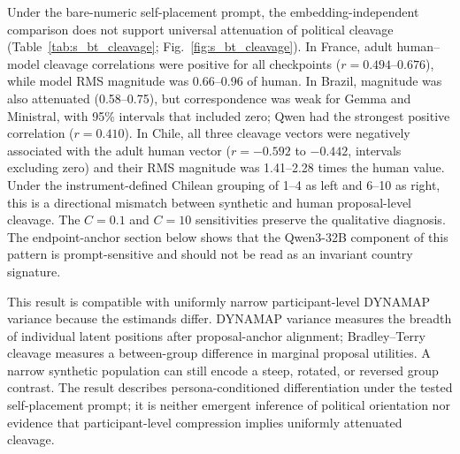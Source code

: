 \documentclass[unnumsec,webpdf,modern,large]{oup-authoring-template}
\begin{document}
Under the bare-numeric self-placement prompt, the embedding-independent comparison does not support universal attenuation of political cleavage (Table~\ref{tab:s_bt_cleavage}; Fig.~\ref{fig:s_bt_cleavage}). In France, adult human--model cleavage correlations were positive for all checkpoints ($r=0.494$--$0.676$), while model RMS magnitude was 0.66--0.96 of human. In Brazil, magnitude was also attenuated (0.58--0.75), but correspondence was weak for Gemma and Ministral, with 95\% intervals that included zero; Qwen had the strongest positive correlation ($r=0.410$). In Chile, all three cleavage vectors were negatively associated with the adult human vector ($r=-0.592$ to $-0.442$, intervals excluding zero) and their RMS magnitude was 1.41--2.28 times the human value. Under the instrument-defined Chilean grouping of 1--4 as left and 6--10 as right, this is a directional mismatch between synthetic and human proposal-level cleavage. The $C=0.1$ and $C=10$ sensitivities preserve the qualitative diagnosis. The endpoint-anchor section below shows that the Qwen3-32B component of this pattern is prompt-sensitive and should not be read as an invariant country signature.

This result is compatible with uniformly narrow participant-level DYNAMAP variance because the estimands differ. DYNAMAP variance measures the breadth of individual latent positions after proposal-anchor alignment; Bradley--Terry cleavage measures a between-group difference in marginal proposal utilities. A narrow synthetic population can still encode a steep, rotated, or reversed group contrast. The result describes persona-conditioned differentiation under the tested self-placement prompt; it is neither emergent inference of political orientation nor evidence that participant-level compression implies uniformly attenuated cleavage.

\begin{table}[p]
\caption{Embedding-independent Bradley--Terry political-cleavage validation. Pearson correlation and sign agreement assess whether the same proposals divide human and synthetic left/right groups in the same direction. RMS ratio and slope assess magnitude; a ratio of one and slope of one denote equality with the matched adult human cleavage vector. Brackets are equal-tailed percentile intervals from paired UUID-cluster bootstraps. For discrete or skewed statistics, a full-sample estimate need not lie at the center of the percentile interval; the France--Ministral sign-agreement estimate is 0.750 [0.633, 0.758].}
\label{tab:s_bt_cleavage}
\centering
\scriptsize
\resizebox{\textwidth}{!}{}
\end{table}
\end{document}
